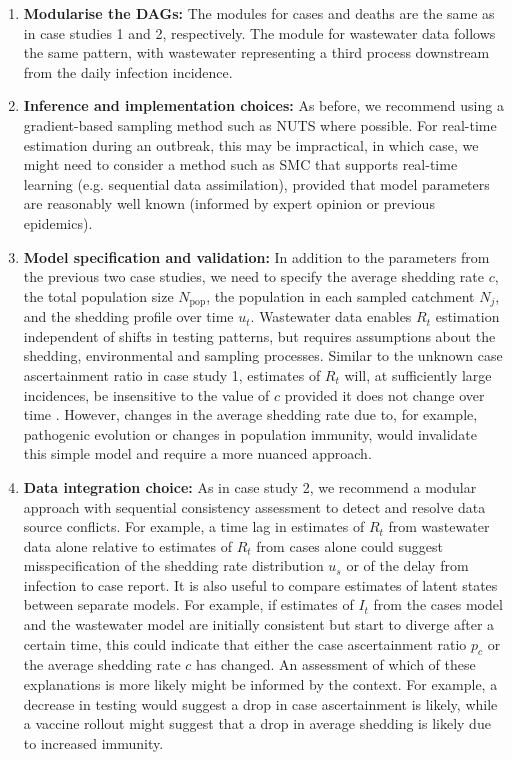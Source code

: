 \documentclass{article}
\begin{document}
\begin{enumerate}
\item \textbf{Modularise the DAGs:} The modules for cases and deaths are the same as in case studies 1 and 2, respectively. The module for wastewater data follows the same pattern, with wastewater representing a third process downstream from the daily infection incidence.
    
    \item \textbf{Inference and implementation choices:} As before, we recommend using a gradient-based sampling method such as \ac{NUTS} where possible. For real-time estimation during an outbreak, this may be impractical, in which case, we might need to consider a method such as \ac{SMC} that supports real-time learning (e.g. sequential data assimilation), provided that model parameters are reasonably well known (informed by expert opinion or previous epidemics).

    \item \textbf{Model specification and validation:} In addition to the parameters from the previous two case studies, we need to specify the average shedding rate $c$, the total population size $N_\mathrm{pop}$, the population in each sampled catchment $N_j$, and the shedding profile over time $u_t$. Wastewater data enables $R_t$ estimation independent of shifts in testing patterns, but requires assumptions about the shedding, environmental and sampling processes. Similar to the unknown case ascertainment ratio in case study 1, estimates of $R_t$ will, at sufficiently large incidences, be insensitive to the value of $c$ provided it does not change over time \citep{dreifuss2025estimated}. However, changes in the average shedding rate due to, for example, pathogenic evolution or changes in population immunity, would invalidate this simple model and require a more nuanced approach. 
    
    \item \textbf{Data integration choice:} As in case study 2, we recommend a modular approach with sequential consistency assessment to detect and resolve data source conflicts. For example, a time lag in estimates of $R_t$ from wastewater data alone relative to estimates of $R_t$ from cases alone could suggest misspecification of the shedding rate distribution $u_s$ or of the delay from infection to case report.  It is also useful to compare estimates of latent states between separate models. For example, if estimates of $I_t$ from the cases model and the wastewater model are initially consistent but start to diverge after a certain time, this could indicate that either the case ascertainment ratio $p_c$ or the average shedding rate $c$ has changed. An assessment of which of these explanations is more likely might be informed by the context. For example, a decrease in testing would suggest a drop in case ascertainment is likely, while a vaccine rollout might suggest that a drop in average shedding is likely due to increased immunity. 


\end{enumerate}
\end{document}
